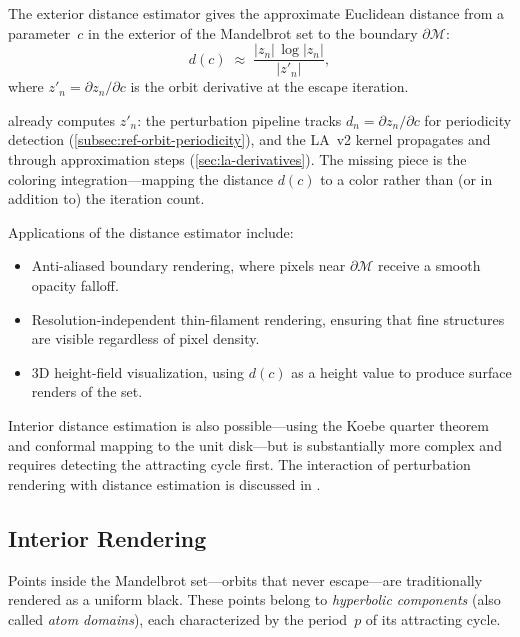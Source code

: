 The exterior distance estimator gives the approximate Euclidean distance
from a parameter~$c$ in the exterior of the Mandelbrot set to the
boundary $\partial\mathcal{M}$:
\begin{equation}
  d(c) \;\approx\; \frac{|z_n|\,\log|z_n|}{|z'_n|},
  \label{eq:distance-estimate}
\end{equation}
where $z'_n = \partial z_n / \partial c$ is the orbit derivative at the
escape iteration.

\FractalShark{} already computes $z'_n$: the perturbation pipeline
tracks $d_n = \partial z_n / \partial c$ for periodicity detection
(\cref{subsec:ref-orbit-periodicity}), and the LA~v2 kernel propagates
 and  through approximation steps
(\cref{sec:la-derivatives}).  The missing piece is the coloring
integration—mapping the distance $d(c)$ to a color rather than (or in
addition to) the iteration count.

Applications of the distance estimator include:
\begin{itemize}
  \item Anti-aliased boundary rendering, where pixels near $\partial
        \mathcal{M}$ receive a smooth opacity falloff.
  \item Resolution-independent thin-filament rendering, ensuring that
        fine structures are visible regardless of pixel density.
  \item 3D height-field visualization, using $d(c)$ as a height value
        to produce surface renders of the set.
\end{itemize}

Interior distance estimation is also possible—using the Koebe quarter
theorem and conformal mapping to the unit disk—but is substantially more
complex and requires detecting the attracting cycle first.  The
interaction of perturbation rendering with distance estimation is
discussed in \cite{HeilandAllen2013Perturbation}.

\subsection{Interior Rendering}
\label{subsec:interior-rendering}

Points inside the Mandelbrot set—orbits that never escape—are
traditionally rendered as a uniform black.  These points belong to
\emph{hyperbolic components} (also called \emph{atom domains}), each
characterized by the period~$p$ of its attracting cycle.

